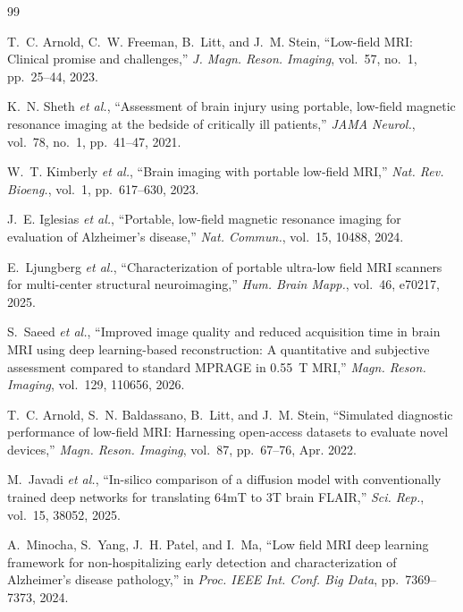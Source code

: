 \begin{thebibliography}{99}

T.~C. Arnold, C.~W. Freeman, B.~Litt, and J.~M. Stein,
``Low-field MRI: Clinical promise and challenges,''
\textit{J. Magn. Reson. Imaging}, vol.~57, no.~1, pp.~25--44, 2023.

K.~N. Sheth \textit{et al.},
``Assessment of brain injury using portable, low-field magnetic resonance imaging at the bedside of critically ill patients,''
\textit{JAMA Neurol.}, vol.~78, no.~1, pp.~41--47, 2021.

W.~T. Kimberly \textit{et al.},
``Brain imaging with portable low-field MRI,''
\textit{Nat. Rev. Bioeng.}, vol.~1, pp.~617--630, 2023.

J.~E. Iglesias \textit{et al.},
``Portable, low-field magnetic resonance imaging for evaluation of Alzheimer's disease,''
\textit{Nat. Commun.}, vol.~15, 10488, 2024.

E.~Ljungberg \textit{et al.},
``Characterization of portable ultra-low field MRI scanners for multi-center structural neuroimaging,''
\textit{Hum. Brain Mapp.}, vol.~46, e70217, 2025.

S.~Saeed \textit{et al.},
``Improved image quality and reduced acquisition time in brain MRI using deep learning-based reconstruction: A quantitative and subjective assessment compared to standard MPRAGE in 0.55~T MRI,''
\textit{Magn. Reson. Imaging}, vol.~129, 110656, 2026.

T.~C. Arnold, S.~N. Baldassano, B.~Litt, and J.~M. Stein,
``Simulated diagnostic performance of low-field MRI: Harnessing open-access datasets to evaluate novel devices,''
\textit{Magn. Reson. Imaging}, vol.~87, pp.~67--76, Apr. 2022.

M.~Javadi \textit{et al.},
``In-silico comparison of a diffusion model with conventionally trained deep networks for translating 64mT to 3T brain FLAIR,''
\textit{Sci. Rep.}, vol.~15, 38052, 2025.

A.~Minocha, S.~Yang, J.~H. Patel, and I.~Ma,
``Low field MRI deep learning framework for non-hospitalizing early detection and characterization of Alzheimer's disease pathology,''
in \textit{Proc. IEEE Int. Conf. Big Data}, pp.~7369--7373, 2024.


\end{thebibliography}
